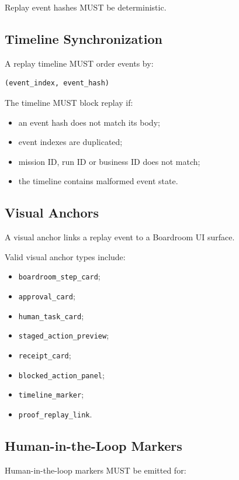 Replay event hashes MUST be deterministic.

\subsection{Timeline Synchronization}

A replay timeline MUST order events by:

\begin{verbatim}
(event_index, event_hash)
\end{verbatim}

The timeline MUST block replay if:

\begin{itemize}
  \item an event hash does not match its body;
  \item event indexes are duplicated;
  \item mission ID, run ID or business ID does not match;
  \item the timeline contains malformed event state.
\end{itemize}

\subsection{Visual Anchors}

A visual anchor links a replay event to a Boardroom UI surface.

Valid visual anchor types include:

\begin{itemize}
  \item \texttt{boardroom\_step\_card};
  \item \texttt{approval\_card};
  \item \texttt{human\_task\_card};
  \item \texttt{staged\_action\_preview};
  \item \texttt{receipt\_card};
  \item \texttt{blocked\_action\_panel};
  \item \texttt{timeline\_marker};
  \item \texttt{proof\_replay\_link}.
\end{itemize}

\subsection{Human-in-the-Loop Markers}

Human-in-the-loop markers MUST be emitted for:

